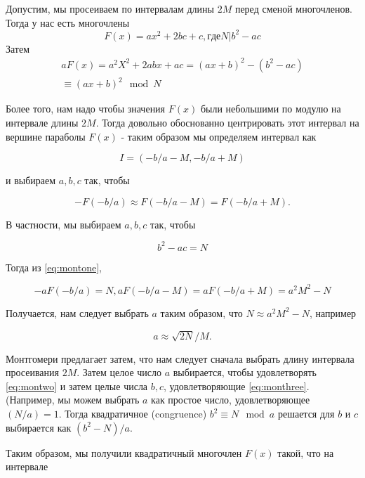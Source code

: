 \documentclass[russian, utf8, a4paper,12pt]{report}
\begin{document}
Допустим, мы просеиваем по интервалам длины $2M$ перед сменой многочленов. Тогда у нас есть многочлены
\begin{equation*}
F(x) = ax^2+2bc+c, где N|b^2-ac
\end{equation*}
Затем
\begin{multline}\label{eq:montone}
aF(x) = a^2X^2+2abx+ac = (ax+b)^2 - (b^2-ac)\\
\equiv (ax+b)^2 \mod N
\end{multline}

Более того, нам надо чтобы значения $F(x)$ были небольшими по модулю на интервале длины $2M$. Тогда довольно обоснованно центрировать этот интервал на вершине параболы $F(x)$ - таким образом мы определяем интервал как

\begin{equation*}
I = (-b/a - M, -b/a + M)
\end{equation*}

и выбираем $a, b, c$ так, чтобы 

\begin{equation*}
-F(-b/a) \approx F(-b/a - M) = F(-b/a + M).
\end{equation*}

В частности, мы выбираем $a, b, c$ так, чтобы

\begin{equation}\label{eq:montwo}
b^2 - ac = N
\end{equation}

Тогда из \eqref{eq:montone},

\begin{equation*}
-aF(-b/a) = N, aF(-b/a - M) = aF(-b/a + M) = a^2M^2 - N
\end{equation*}

Получается, нам следует выбрать $a$ таким образом, что $N \approx a^2M^2 -N$, например

\begin{equation}\label{eq:monthree}
a \approx \sqrt{2N}/M.
\end{equation}

Монтгомери предлагает затем, что нам следует сначала выбрать длину интервала просеивания $2M$. Затем целое число $a$ выбирается, чтобы удовлетворять \eqref{eq:montwo} и затем целые числа $b, c$, удовлетворяющие \eqref{eq:monthree}. (Например, мы можем выбрать $a$ как простое число, удовлетворяющее $(N/a) = 1$. Тогда квадратичное (congruence) $b^2 \equiv N \mod a$ решается для $b$ и $c$ выбирается как $(b^2 -N)/a$.

Таким образом, мы получили квадратичный многочлен $F(x)$ такой, что на интервале 
\end{document}
